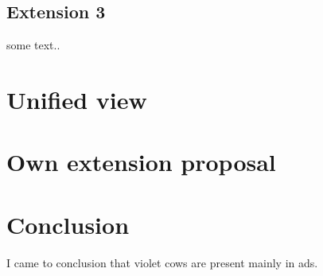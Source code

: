 \documentclass[11pt,oneside,draft]{fithesis2}
\begin{document}
\section{Extension 3}

some text..

\chapter{Unified view}

\chapter{Own extension proposal}

\chapter{Conclusion}

I came to conclusion that violet cows are present mainly in ads.



\end{document}
